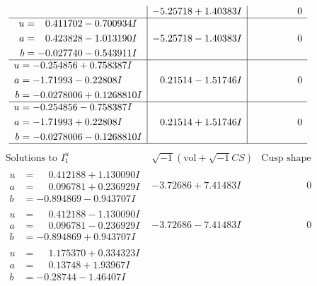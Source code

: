 \documentclass[1p]{elsarticle_modified}
\theoremstyle{definition}
\newcommand{\I}{\sqrt{-1}}
\begin{document}
$$\begin{array}{c|c|c}
 & -5.25718 + 1.40383 I & \phantom{-0.000000 } 0 \\ \hline\begin{aligned}
u &= \phantom{-}0.411702 - 0.700934 I \\
a &= \phantom{-}0.423828 - 1.013190 I \\
b &= -0.027740 - 0.543911 I\end{aligned}
 & -5.25718 - 1.40383 I & \phantom{-0.000000 } 0 \\ \hline\begin{aligned}
u &= -0.254856 + 0.758387 I \\
a &= -1.71993 - 0.22808 I \\
b &= -0.0278006 + 0.1268810 I\end{aligned}
 & \phantom{-}0.21514 - 1.51746 I & \phantom{-0.000000 } 0 \\ \hline\begin{aligned}
u &= -0.254856 - 0.758387 I \\
a &= -1.71993 + 0.22808 I \\
b &= -0.0278006 - 0.1268810 I\end{aligned}
 & \phantom{-}0.21514 + 1.51746 I & \phantom{-0.000000 } 0\\
 \hline 
 \end{array}$$\newpage$$\begin{array}{c|c|c}  
\text{Solutions to }I^u_{1}& \I (\text{vol} + \sqrt{-1}CS) & \text{Cusp shape}\\
 \hline 
\begin{aligned}
u &= \phantom{-}0.412188 + 1.130090 I \\
a &= \phantom{-}0.096781 + 0.236929 I \\
b &= -0.894869 - 0.943707 I\end{aligned}
 & -3.72686 + 7.41483 I & \phantom{-0.000000 } 0 \\ \hline\begin{aligned}
u &= \phantom{-}0.412188 - 1.130090 I \\
a &= \phantom{-}0.096781 - 0.236929 I \\
b &= -0.894869 + 0.943707 I\end{aligned}
 & -3.72686 - 7.41483 I & \phantom{-0.000000 } 0 \\ \hline\begin{aligned}
u &= \phantom{-}1.175370 + 0.334323 I \\
a &= \phantom{-}0.13748 + 1.93967 I \\
b &= -0.28744 - 1.46407 I\end{aligned}

\end{array}$$
\end{document}

